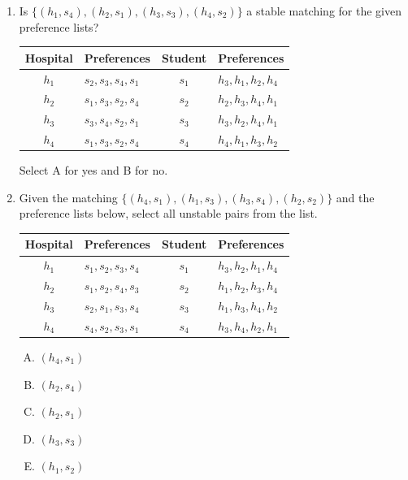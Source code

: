 \documentclass[11pt]{article}
\begin{document}
\begin{enumerate}

\item Is $\{(h_1, s_4), (h_2, s_1), (h_3, s_3), (h_4, s_2)\}$ a stable matching for the given preference lists?

\begin{table}[h]
\centering
\begin{tabular}{c | l || c | l}
\textbf{Hospital} & \textbf{Preferences} & \textbf{Student} & \textbf{Preferences} \\
\hline
$h_1$ & $s_2 , s_3 , s_4 , s_1$ & $s_1$ & $h_3 , h_1 , h_2 , h_4$ \\
$h_2$ & $s_1 , s_3 , s_2 , s_4$ & $s_2$ & $h_2 , h_3 , h_4 , h_1$ \\
$h_3$ & $s_3 , s_4 , s_2 , s_1$ & $s_3$ & $h_3 , h_2 , h_4 , h_1$ \\
$h_4$ & $s_1 , s_3 , s_2 , s_4$ & $s_4$ & $h_4 , h_1 , h_3 , h_2$ \\
\end{tabular}
\end{table}

Select A for yes and B for no.

\item Given the matching
$\{(h_4, s_1), (h_1, s_3), (h_3, s_4), (h_2, s_2)\}$ and the
preference lists below,
select all unstable pairs from the list.

\begin{table}[h]
\centering
\begin{tabular}{c | l || c | l}
\textbf{Hospital} & \textbf{Preferences} & \textbf{Student} & \textbf{Preferences} \\
\hline
$h_1$ & $s_1 , s_2 , s_3 , s_4$ & $s_1$ & $h_3 , h_2 , h_1 , h_4$ \\
$h_2$ & $s_1 , s_2 , s_4 , s_3$ & $s_2$ & $h_1 , h_2 , h_3 , h_4$ \\
$h_3$ & $s_2 , s_1 , s_3 , s_4$ & $s_3$ & $h_1 , h_3 , h_4 , h_2$ \\
$h_4$ & $s_4 , s_2 , s_3 , s_1$ & $s_4$ & $h_3 , h_4 , h_2 , h_1$ \\
\end{tabular}
\end{table}

\begin{enumerate}[A.]
    \item $(h_4, s_1)$
    \item $(h_2, s_4)$
    \item $(h_2, s_1)$
    \item $(h_3, s_3)$
    \item $(h_1, s_2)$
\end{enumerate}



\end{enumerate}
\end{document}
